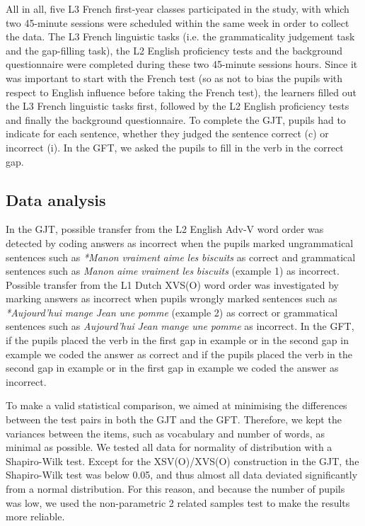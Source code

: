 \documentclass[output=paper,modfonts,nonflat, newtxmath]{langsci/langscibook}
\begin{document}
All in all, five L3 French first-year classes participated in the study, with which two 45-minute sessions were scheduled within the same week in order to collect the data. The L3 French linguistic tasks (i.e. the grammaticality judgement task and the gap-filling task), the L2 English proficiency tests and the background questionnaire were completed during these two 45-minute sessions hours. Since it was important to start with the French test (so as not to bias the pupils with respect to English influence before taking the French test), the learners filled out the L3 French linguistic tasks first, followed by the L2 English proficiency tests and finally the background questionnaire. To complete the GJT, pupils had to indicate for each sentence, whether they judged the sentence correct (c) or incorrect (i). In the GFT, we asked the pupils to fill in the verb in the correct gap.

\subsection{{Data} {analysis} }
\label{sec:stadt:3.5}

In the GJT, possible transfer from the L2 English Adv-V word order was detected by coding answers as incorrect when the pupils marked ungrammatical sentences such as \textit{*Manon} \textit{vraiment} \textit{aime} \textit{les} \textit{biscuits} as correct and grammatical sentences such as \textit{Manon} \textit{aime} \textit{vraiment} \textit{les} \textit{biscuits} (example 1) as incorrect. Possible transfer from the L1 Dutch XVS(O) word order was investigated by marking answers as incorrect when pupils wrongly marked sentences such as \textit{*Aujourd’hui} \textit{mange} \textit{Jean} \textit{une} \textit{pomme} (example 2) as correct or grammatical sentences such as \textit{Aujourd’hui} \textit{Jean} \textit{mange} \textit{une} \textit{pomme} as incorrect. In the GFT, if the pupils placed the verb in the first gap in example  or in the second gap in example  we coded the answer as correct and if the pupils placed the verb in the second gap in example  or in the first gap in example  we coded the answer as incorrect.

To make a valid statistical comparison, we aimed at minimising the differences between the test pairs in both the GJT and the GFT. Therefore, we kept the variances between the items, such as vocabulary and number of words, as minimal as possible. We tested all data for normality of distribution with a Shapiro-Wilk test. Except for the XSV(O)/XVS(O) construction in the GJT, the Shapiro-Wilk test was below 0.05, and thus almost all data deviated significantly from a normal distribution. For this reason, and because the number of pupils was low, we used the non-parametric 2 related samples test to make the results more reliable.
\end{document}
